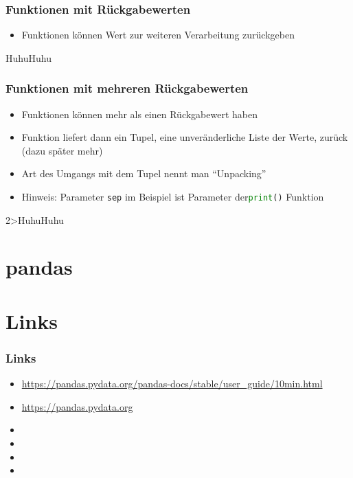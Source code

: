 \documentclass[ngerman]{beamer}
\newcommand{\ta}[1]{\textattachfile[color=1 0 0]{#1}{Code}}
\begin{document}
\begin{frame}[containsverbatim]
\frametitle{Funktionen mit Rückgabewerten}

\begin{itemize}
	\item Funktionen können Wert zur weiteren Verarbeitung zurückgeben
\end{itemize}

%

\begin{ausgabe}
HuhuHuhu
\end{ausgabe}

\end{frame}


\begin{frame}[containsverbatim]
\frametitle{Funktionen mit mehreren Rückgabewerten}

\begin{itemize}
	\item Funktionen können mehr als einen Rückgabewert haben
	\item Funktion liefert dann ein Tupel, eine unveränderliche Liste der Werte, zurück (dazu später mehr)
	\item Art des Umgangs mit dem Tupel nennt man \enquote{Unpacking}
	\item Hinweis: Parameter \texttt{sep} im Beispiel ist Parameter der\newline \lstinline[language={Python}]{print()}  Funktion
\end{itemize}

%

\vspace*{-1em}
\begin{ausgabe}
2>HuhuHuhu
\end{ausgabe}
\end{frame}



\section{pandas}


\section{Links}


\begin{frame}
\frametitle{Links}

\begin{itemize}
	\item \url{https://pandas.pydata.org/pandas-docs/stable/user_guide/10min.html}
	\item \url{https://pandas.pydata.org}
	\item 
	\item 
	\item 
	\item 
\end{itemize}



\end{frame}
\end{document}
